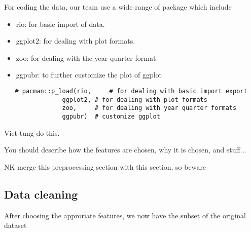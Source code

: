 For coding the data, our team use a wide range of package which include 
\begin{itemize}
    \item rio: for basic import of data.
    \item ggplot2: for dealing with plot formats.
    \item zoo: for dealing with the year quarter format
    \item ggpubr: to further customize the plot of ggplot
\end{itemize}
\begin{verbatim}
   # pacman::p_load(rio,     # for dealing with basic import export
                ggplot2, # for dealing with plot formats
                zoo,     # for dealing with year quarter formats
                ggpubr)  # customize ggplot 

\end{verbatim}










Viet tung do this.

You should describe how the features are chosen, why it is chosen, and stuff...

NK merge this preprocessing section with this section, so beware









\subsection{Data cleaning}
After choosing the approriate features, we now have the subset of the original dataset